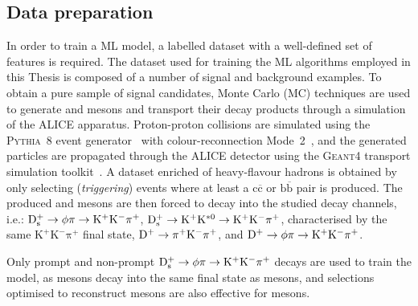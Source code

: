 \subsection{Data preparation}\label{sec:ml_data_preparation}
In order to train a ML model, a labelled dataset with a well-defined set of features is required. The dataset used for training the ML algorithms employed in this Thesis is composed of a number of signal and background examples. To obtain a pure sample of signal candidates, Monte Carlo (MC) techniques are used to generate \ds and \dpl mesons and transport their decay products through a simulation of the ALICE apparatus. Proton-proton collisions are simulated using the \textsc{Pythia~8} event generator~\cite{Bierlich:2022pfr} with colour-reconnection Mode~2~\cite{Christiansen:2015yqa}, and the generated particles are propagated through the ALICE detector using the \textsc{Geant4} transport simulation toolkit~\cite{GEANT4:2002zbu}. A dataset enriched of heavy-flavour hadrons is obtained by only selecting (\emph{triggering}) events where at least a $\mathrm{c\overline{c}}$ or $\mathrm{b\overline{b}}$ pair is produced. The produced \ds and \dpl mesons are then forced to decay into the studied decay channels, i.e.: \mbox{$\mathrm{D_s^+} \rightarrow \phi \pi \rightarrow \mathrm{K^+K^-\pi^+}$}, $\mathrm{D_s^+} \rightarrow \mathrm{K^+K^{*0}}\rightarrow \mathrm{K^+K^-\pi^+}$, characterised by the same $\mathrm{K^+K^-\pi^+}$ final state, $\mathrm{D^+} \rightarrow \mathrm{\pi^+K^-\pi^+}$, and $\mathrm{D^+} \rightarrow \phi \pi \rightarrow \mathrm{K^+K^-\pi^+}$. 


Only prompt and non-prompt \mbox{$\mathrm{D_s^+} \rightarrow \phi \pi \rightarrow \mathrm{K^+K^-\pi^+}$} decays are used to train the model, as \dpl mesons decay into the same final state as \ds mesons, and selections optimised to reconstruct \ds mesons are also effective for \dpl mesons. 

